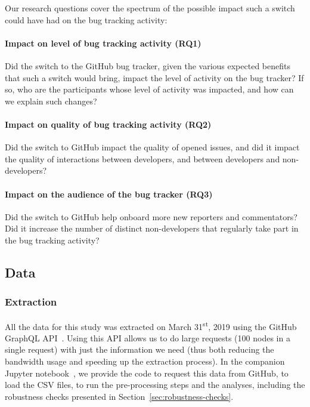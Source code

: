 Our research questions cover the spectrum of the possible impact such a switch could have had on the bug tracking activity:

\paragraph{Impact on level of bug tracking activity (RQ1)}

Did the switch to the GitHub bug tracker, given the various expected benefits that such a switch would bring, impact the level of activity on the bug tracker? If so, who are the participants whose level of activity was impacted, and how can we explain such changes?

\paragraph{Impact on quality of bug tracking activity (RQ2)}

Did the switch to GitHub impact the quality of opened issues, and did it impact the quality of interactions between developers, and between developers and non-developers?

\paragraph{Impact on the audience of the bug tracker (RQ3)}

Did the switch to GitHub help onboard more new reporters and commentators? Did it increase the number of distinct non-developers that regularly take part in the bug tracking activity?

\subsection{Data}

\subsubsection{Extraction}

All the data for this study was extracted on March 31\textsuperscript{st}, 2019 using the GitHub GraphQL API~\cite{github_graphql_API}.
Using this API allows us to do large requests (100 nodes in a single request) with just the information we need (thus both reducing the bandwidth usage and speeding up the extraction process).
In the companion Jupyter notebook~\cite{zimmermann2019bugtracker}, we provide the code to request this data from GitHub, to load the CSV files, to run the pre-processing steps and the analyses, including the robustness checks presented in Section~\ref{sec:robustness-checks}.

